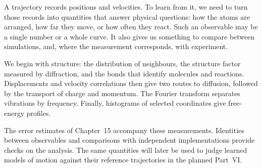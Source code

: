 A trajectory records positions and velocities. To learn from it, we
need to turn those records into quantities that answer physical
questions: how the atoms are arranged, how far they move, or how often
they react. Such an observable may be a single number or a whole curve.
It also gives us something to compare between simulations, and, where
the measurement corresponds, with experiment.

We begin with structure: the distribution of neighbours, the structure
factor measured by diffraction, and the bonds that identify molecules
and reactions. Displacements and velocity correlations then give two
routes to diffusion, followed by the transport of charge and momentum.
The Fourier transform separates vibrations by frequency. Finally,
histograms of selected coordinates give free-energy profiles.

The error estimates of Chapter~15 accompany these measurements. Identities
between observables and comparisons with independent implementations
provide checks on the analysis. The same quantities will later be used
to judge learned models of motion against their reference trajectories
in the planned Part~VI.
